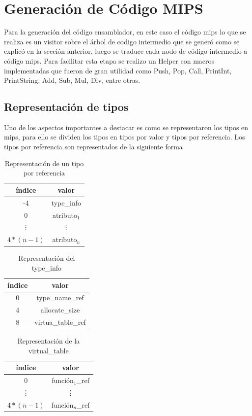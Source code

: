 \documentclass[12pt,a4paper]{article}
\begin{document}
	\section{Generación de Código MIPS}
		Para la generación del código ensamblador, en este caso el código mips lo que se realiza es un visitor sobre el árbol de codigo intermedio que se generó como se explicó en la sección anterior, luego se traduce cada nodo de código intermedio a código mips. Para facilitar esta etapa se realizo un Helper con macros implementadas que fueron de gran utilidad como 
		Push, Pop, Call, PrintInt, PrintString, Add, Sub, Mul, Div, entre otras.
		\subsection{Representación de tipos}
			Uno de los aspectos importantes a destacar es como se representaron los tipos en mips, para ello se dividen los tipos en tipos por valor y tipos por referencia. Los tipos por referencia son representados de la siguiente forma
			\begin{multicols}{2}
				\begin{table}[H]
					\centering
					\begin{tabular}{|c|c|}
						\hline
						índice & valor \\\hline
						-4 & type\_info \\\hline
						0 & atributo$_1$ \\\hline
						\vdots & \vdots \\\hline
						$4*(n-1)$ & atributo$_n$ \\\hline 
					\end{tabular} 
					\caption{Representación de un tipo por referencia}		
				\end{table}
				\begin{table}[H]
					\centering
					\begin{tabular}{|c|c|}
						\hline
						índice & valor \\\hline
						0 & type\_name\_ref \\\hline
						4 & allocate\_size \\\hline
						8 & virtua\_table\_ref \\\hline
					\end{tabular}
					\caption{Representación del type\_info}		
				\end{table}
			\end{multicols}
		\begin{table}[H]
			\centering
			\begin{tabular}{|c|c|}
				\hline
				índice & valor \\\hline
				0 & función$_1$\_ref \\\hline
				\vdots & \vdots \\\hline
				$4 * (n - 1)$ & función$_n$\_ref \\\hline
			\end{tabular}
			\caption{Representación de la virtual\_table}		
		\end{table}
\end{document}
